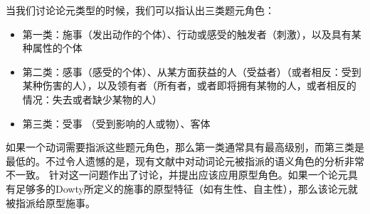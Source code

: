 当我们讨论论元类型的时候，我们可以指认出三类题元角色：
\begin{itemize}
\item 第一类：施事（发出动作的个体）、行动或感受的触发者（刺激），以及具有某种属性的个体
\item 第二类：感事（感受的个体）、从某方面获益的人（受益者）（或者相反：受到某种伤害的人），以及领有者（所有者，或者即将拥有某物的人，或者相反的情况：失去或者缺少某物的人）
\item 第三类：受事 （受到影响的人或物）、客体
\end{itemize}
如果一个动词需要指派这些题元角色，那么第一类通常具有最高级别，而第三类是最低的。不过令人遗憾的是，现有文献中对动词论元被指派的语义角色的分析非常不一致。 \citet{Dowty91a}针对这一问题作出了讨论，并提出应该应用原型角色。如果一个论元具有足够多的Dowty所定义的施事的原型特征（如有生性、自主性），那么该论元就被指派给原型施事。
\nocite{Gruber65a-u,Fillmore68,Fillmore71a-u,Jackendoff72a-u,Dowty91a}

